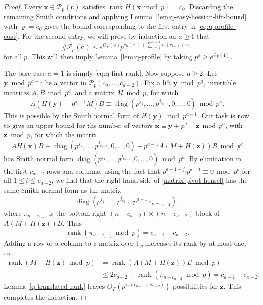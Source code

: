 \documentclass[a4paper,11pt, twoside,reqno]{amsart}
\theoremstyle{plain}
\theoremstyle{definition}
\theoremstyle{remark}
\newcommand{\bfx}{\bm{x}}
\newcommand{\bfy}{\bm{y}}
\newcommand{\bfz}{\bm{z}}
\newcommand{\bfc}{\bm{c}}
\DeclareMathOperator{\rank}{rank}
\newcommand{\ve}{\varepsilon}
\renewcommand{\le}{\leqslant}
\renewcommand{\ge}{\geqslant}
\newcommand{\FF}{\mathbb{F}}
\newcommand{\diag}{\operatorname{diag}}
\numberwithin{equation}{section}
\begin{document}
\begin{proof}
Every $\bfx\in\mathcal P_p(\bfc)$ satisfies
$\rank H(\bfx\bmod p)=c_0$.
Discarding the remaining Smith conditions and applying
Lemma~\ref{lem:q-easy-hessian-lift-bound} with $\varrho=c_0$
gives the bound corresponding to the first entry in
\eqref{eq:q-profile-cost}.
For the second entry, we will prove by induction on $a\ge 1$ that
\begin{equation*}
\#\mathcal P_p(\bfc)
\le e^{O_F(a)}
p^{\delta_n(c_0) + \sum_{i=1}^{a-1}\tau_n(c_{i-1}+c_i)}
\end{equation*}
for all $p$.
This will then imply Lemma~\ref{lem:q-profile}
by taking $p^\ve \ge e^{O_F(1)}$.

The base case $a=1$ is simply \eqref{eq:q-first-rank}.
Now suppose $a\ge 2$.
Let $\bfy\bmod{p^{a-1}}$ be a vector in $\mathcal P_p(c_0,\dots,c_{a-2})$.
Fix a lift $\bfy\bmod{p^a}$,
invertible matrices $A,B\bmod{p^a}$,
and a matrix $M\bmod{p}$,
for which $$A(H(\bfy)-p^{a-1}M)B
\equiv \diag(p^{j_1},\dots,p^{j_{c_{a-2}}},0,\dots,0)
\bmod{p^a}.$$
This is possible by the Smith normal form of $H(\bfy)\bmod{p^{a-1}}$.
Our task is now to give an upper bound for the number of vectors
$\bfx \equiv \bfy+p^{a-1}\bfz \bmod{p^a}$, with $\bfz\bmod{p}$,
for which the matrix
\begin{equation}
\label{matrix-pivot-hensel}
AH(\bfx)B \equiv \diag(p^{j_1},\dots,p^{j_{c_{a-2}}},0,\dots,0)
+ p^{a-1}A(M+H(\bfz))B \bmod{p^a}
\end{equation}
has Smith normal form $\diag(p^{j_1},\ldots,p^{j_{c_{a-1}}},0,\dots,0) \bmod{p^a}$.
By elimination in the first $c_{a-2}$ rows and columns,
using the fact that $p^{a-1-j_i} p^{a-1} \equiv 0\bmod{p^a}$
for all $1\le i\le c_{a-2}$, we find that
the right-hand side of \eqref{matrix-pivot-hensel}
has the same Smith normal form as
the matrix $$\diag(p^{j_1},\dots,p^{j_{c_{a-2}}},p^{a-1}\pi_{n-c_{a-2}}),$$
where $\pi_{n-c_{a-2}}$ is the bottom-right
$(n-c_{a-2}) \times (n-c_{a-2})$ block of $A(M+H(\bfz))B$.
Thus $$\rank(\pi_{n-c_{a-2}}\bmod{p}) = c_{a-1}-c_{a-2}.$$
Adding a row or a column to a matrix
over $\FF_p$ increases its rank by at most one, so
\begin{equation*}
\begin{split}
\rank(M+H(\bfz)\bmod{p})
&= \rank(A(M+H(\bfz))B\bmod{p}) \\
&\le 2c_{a-2} + \rank(\pi_{n-c_{a-2}}\bmod{p})
= c_{a-1}+c_{a-2}.
\end{split}
\end{equation*}
Lemma~\ref{q-translated-rank} leaves
\(O_F(p^{\tau_n(c_{a-1}+c_{a-2})})\) possibilities for \(\bfz\).
This completes the induction.
\end{proof}
\end{document}
